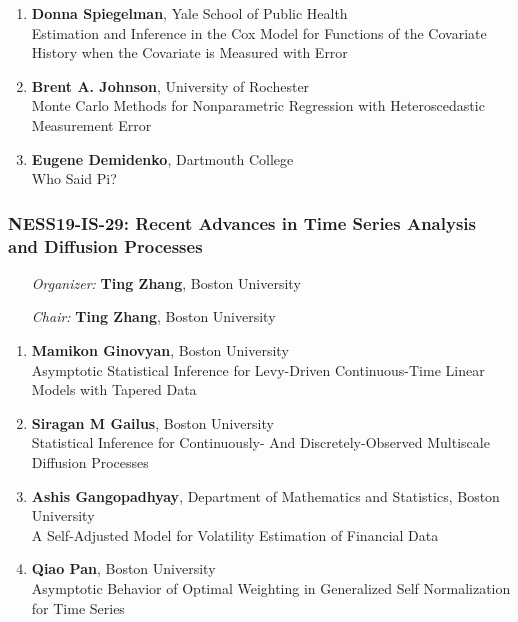 \begin{enumerate}
\item \textbf{Donna Spiegelman}, Yale School of Public Health \\
Estimation and Inference in the Cox Model for Functions of the Covariate History when the Covariate is Measured with Error
\item \textbf{Brent A. Johnson}, University of Rochester \\
Monte Carlo Methods for Nonparametric Regression with Heteroscedastic Measurement Error
\item \textbf{Eugene Demidenko}, Dartmouth College \\
Who Said Pi?
\end{enumerate}

\subsubsection*{NESS19-IS-29: Recent Advances in Time Series Analysis and Diffusion Processes}

\begin{enumerate}[align=left]
\item [\emph{Organizer:}] \textbf{Ting Zhang}, Boston University \\
\item [\emph{Chair:}] \textbf{Ting Zhang}, Boston University
\end{enumerate}

\begin{enumerate}
\item \textbf{Mamikon Ginovyan}, Boston University \\
Asymptotic Statistical Inference for Levy-Driven Continuous-Time Linear Models with Tapered Data
\item \textbf{Siragan M Gailus}, Boston University \\
Statistical Inference for Continuously- And Discretely-Observed Multiscale Diffusion Processes
\item \textbf{Ashis Gangopadhyay}, Department of Mathematics and Statistics, Boston University \\
A Self-Adjusted Model for Volatility Estimation of Financial Data
\item \textbf{Qiao Pan}, Boston University \\
Asymptotic Behavior of Optimal Weighting in Generalized Self Normalization for Time Series
\end{enumerate}

